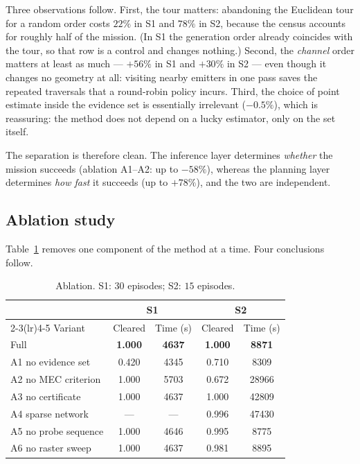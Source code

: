 \documentclass[preprint,12pt,3p]{elsarticle}
\theoremstyle{definition}
\begin{document}
Three observations follow. First, the tour matters: abandoning the Euclidean tour for a random
order costs $22\%$ in S1 and $78\%$ in S2, because the census accounts for roughly half of the
mission. (In S1 the generation order already coincides with the tour, so that row is a control and
changes nothing.) Second, the \emph{channel} order matters at least as much --- $+56\%$ in S1 and
$+30\%$ in S2 --- even though it changes no geometry at all: visiting nearby emitters in one pass
saves the repeated traversals that a round-robin policy incurs. Third, the choice of point estimate
inside the evidence set is essentially irrelevant ($-0.5\%$), which is reassuring: the method does
not depend on a lucky estimator, only on the set itself.

The separation is therefore clean. The inference layer determines \emph{whether} the
mission succeeds (ablation A1--A2: up to $-58\%$), whereas the planning layer determines
\emph{how fast} it succeeds (up to $+78\%$), and the two are independent.

\subsection{Ablation study}
\label{sec:ablation}

Table~\ref{tab:abl} removes one component of the method at a time. Four conclusions follow.

\begin{table}[t]
\caption{Ablation. S1: $30$ episodes; S2: $15$ episodes.}
\label{tab:abl}
\centering
\small
\begin{tabular}{lcccc}
\toprule
& \multicolumn{2}{c}{S1} & \multicolumn{2}{c}{S2} \\
\cmidrule(lr){2-3}\cmidrule(lr){4-5}
Variant & Cleared & Time (s) & Cleared & Time (s) \\
\midrule
Full                 & \textbf{1.000} & \textbf{4637} & \textbf{1.000} & \textbf{8871} \\
A1 no evidence set   & 0.420 & 4345 & 0.710 & 8309 \\
A2 no MEC criterion  & 1.000 & 5703 & 0.672 & 28966 \\
A3 no certificate    & 1.000 & 4637 & 1.000 & 42809 \\
A4 sparse network    & ---   & ---  & 0.996 & 47430 \\
A5 no probe sequence & 1.000 & 4646 & 0.995 & 8775 \\
A6 no raster sweep   & 1.000 & 4637 & 0.981 & 8895 \\
\bottomrule
\end{tabular}
\end{table}
\end{document}
